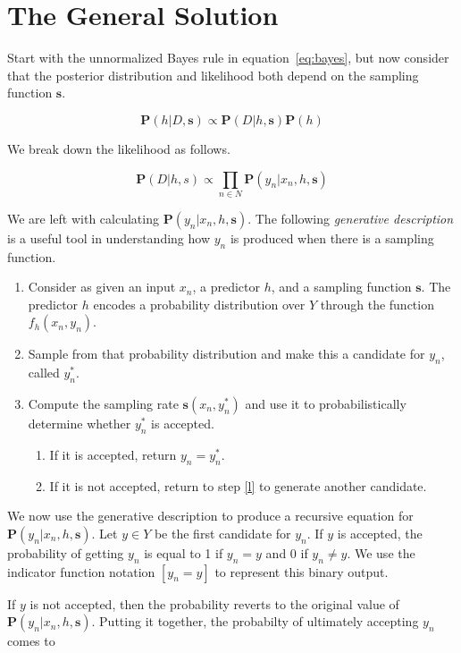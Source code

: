 \documentclass[twoside]{article}
\begin{document}
\section{The General Solution}
\label{section:solution}

Start with the unnormalized Bayes rule in equation~\eqref{eq:bayes}, but now consider that the posterior distribution and likelihood both depend on the sampling function \(\mathbf{s}\).

\[\mathbf{P}(h|D,\mathbf{s})\propto\mathbf{P}(D|h,\mathbf{s})\mathbf{P}(h)\]

We break down the likelihood as follows.

\[\mathbf{P}(D|h,s)\propto\prod_{n \in N}\mathbf{P}(y_n|x_n,h,\mathbf{s})\]

We are left with calculating \(\mathbf{P}(y_n|x_n,h,\mathbf{s})\). The following \textit{generative description} is a useful tool in understanding how \(y_n\) is produced when there is a sampling function.

\begin{enumerate}
	\item Consider as given an input \(x_n\), a predictor \(h\), and a sampling function \(\mathbf{s}\). The predictor \(h\) encodes a probability distribution over \(Y\) through the function \(f_h(x_n,y_n)\).
	\item \label{l} Sample from that probability distribution and make this a candidate for \(y_n\), called \(y_n^*\).
	\item Compute the sampling rate \(\mathbf{s}(x_n,y_n^*)\) and use it to probabilistically determine whether \(y_n^*\) is accepted.
    \begin{enumerate}
        \item If it is accepted, return \(y_n=y_n^*\).
        \item If it is not accepted, return to step \ref{l} to generate another candidate.
    \end{enumerate}
\end{enumerate}

We now use the generative description to produce a recursive equation for \(\mathbf{P}(y_n|x_n,h,\mathbf{s})\). Let \(y \in Y\) be the first candidate for \(y_n\). If \(y\) is accepted, the probability of getting \(y_n\) is equal to 1 if \(y_n = y\) and 0 if \(y_n \neq y\). We use the indicator function notation \(\left [y_n = y\right ]\) to represent this binary output.

If \(y\) is not accepted, then the probability reverts to the original value of \(\mathbf{P}(y_n|x_n,h,\mathbf{s})\). Putting it together, the probabilty of ultimately accepting \(y_n\) comes to
\end{document}
